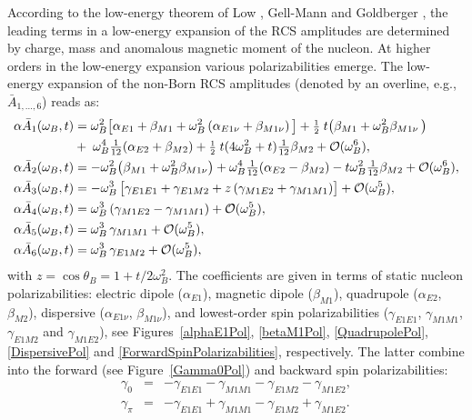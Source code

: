 \documentclass[preprints,review,accept,moreauthors,pdftex]{Definitions/mdpi}
\def\beq{\begin{equation}}
\def\eeq{\end{equation}}
\def\bea{\begin{eqnarray}}
\def\eea{\end{eqnarray}}
\def\boxfrac#1#2{\mbox{$\frac{#1}{#2}$}}
\def\al{\alpha}
\def\ga{\gamma} \def\Ga{{\it\Gamma}}
\def\w{\omega} \def\W{\Omega} \def\hw{\hat{\omega}}
\def\half{\mbox{\small{$\frac{1}{2}\;$}}}
\begin{document}
According to the low-energy theorem of Low \cite{ Low:1954kd}, Gell-Mann and Goldberger \cite{GellMann:1954kc}, the leading terms in a low-energy expansion of the RCS amplitudes are determined by charge, mass and anomalous magnetic moment of the nucleon. At higher orders in the low-energy expansion various polarizabilities emerge. 
The low-energy expansion of the non-Born RCS amplitudes (denoted by an overline, e.g., $\bar A_{1,\dots,6}$) reads as:
\beq
\label{eq:anb}
\begin{aligned}
\al \bar A_1(\w_B ,t) &=   \omega_B^2 \big[ \alpha_{E1}+ \beta_{M1} + 
\omega_B^2\, (\alpha_{E1\nu}+ \beta_{M1\nu})\, \big] + \half t 
\big( \beta_{M1} + \w_B^2 \beta_{M1\nu} \, \big) \\
&+\;  \w_B^4 \boxfrac{1}{12} ( \alpha_{E2}+\beta_{M2}) 
+\half t (4\w_B^2+t)\boxfrac{1}{12} \beta_{M2}+ \mathcal{O}(\omega_B ^6), \\ 
\al \bar A_2 (\w_B ,t)&=   - \w_B^2 \big( \beta_{M1} + \w_B^2 \beta_{M1\nu}
\big) +
\w_B^4 \boxfrac{1}{12} ( \alpha_{E2}-\beta_{M2}) -
t \w_B^2\boxfrac{1}{12} \beta_{M2}+ \mathcal{O}(\omega_B^6),\\
\al \bar A_3(\w_B ,t) &= -  \omega_B^3 \, \big[\gamma_{E1E1}+\gamma_{E1M2} + z\, (\gamma_{M1E2}+\gamma_{M1M1})  \big] + \mathcal{O}(\omega_B^5),  \\ 
\al \bar A_4(\w_B ,t) &=  \omega_B^3\, (\gamma_{M1E2}-\gamma_{M1M1})   + \mathcal{O}(\omega_B^5),   \\
\al \bar A_5(\w_B ,t) &=   \omega_B^3 \, \gamma_{M1M1}+ \mathcal{O}(\omega_B^5),\\
\al \bar A_6 (\w_B ,t) &= \omega_B^3 \,  \gamma_{E1M2}+ \mathcal{O}(\omega_B^5),
\end{aligned}
\eeq
with $z=\cos \theta_B = 1+t/2\omega_B^2$. The coefficients are given in terms of static nucleon polarizabilities: electric dipole ($\al_{E1}$),  magnetic dipole ($\beta_{M1}$), quadrupole ($\al_{E2}$, $\beta_{M2}$), dispersive ($\al_{E1\nu}$, $\beta_{M1\nu}$), and lowest-order spin polarizabilities ($\ga_{E1E1}$, $\ga_{M1M1}$, $\ga_{E1M2}$ and $\ga_{M1E2}$), see Figures~\ref{alphaE1Pol}, \ref{betaM1Pol}, \ref{QuadrupolePol}, \ref{DispersivePol} and \ref{ForwardSpinPolarizabilities}, respectively. The latter combine into the forward (see Figure~\ref{Gamma0Pol}) and backward spin polarizabilities:
\bea
\ga_0 &=& - \ga_{E1E1}- \ga_{M1M1}-\ga_{E1M2}
-\ga_{M1E2},\\
\ga_\pi &=& - \ga_{E1E1}+ \ga_{M1M1}-\ga_{E1M2}
+\ga_{M1E2}.
\eea
\end{document}

